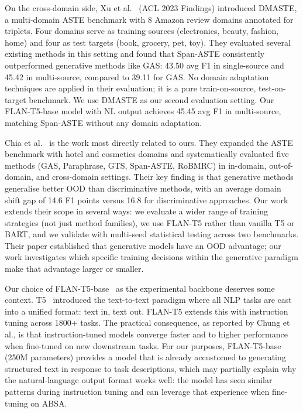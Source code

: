 \documentclass[12pt,a4paper]{report}
\begin{document}
On the cross-domain side, Xu et al.~\cite{xu2023dmaste} (ACL 2023 Findings) introduced DMASTE, a multi-domain ASTE benchmark with 8 Amazon review domains annotated for triplets. Four domains serve as training sources (electronics, beauty, fashion, home) and four as test targets (book, grocery, pet, toy). They evaluated several existing methods in this setting and found that Span-ASTE consistently outperformed generative methods like GAS: 43.50 avg F1 in single-source and 45.42 in multi-source, compared to 39.11 for GAS. No domain adaptation techniques are applied in their evaluation; it is a pure train-on-source, test-on-target benchmark. We use DMASTE as our second evaluation setting. Our FLAN-T5-base model with NL output achieves 45.45 avg F1 in multi-source, matching Span-ASTE without any domain adaptation.

Chia et al.~\cite{chia2022rethinking} is the work most directly related to ours. They expanded the ASTE benchmark with hotel and cosmetics domains and systematically evaluated five methods (GAS, Paraphrase, GTS, Span-ASTE, RoBMRC) in in-domain, out-of-domain, and cross-domain settings. Their key finding is that generative methods generalise better OOD than discriminative methods, with an average domain shift gap of 14.6 F1 points versus 16.8 for discriminative approaches. Our work extends their scope in several ways: we evaluate a wider range of training strategies (not just method families), we use FLAN-T5 rather than vanilla T5 or BART, and we validate with multi-seed statistical testing across two benchmarks. Their paper established that generative models have an OOD advantage; our work investigates which specific training decisions within the generative paradigm make that advantage larger or smaller.

Our choice of FLAN-T5-base~\cite{chung2022scaling} as the experimental backbone deserves some context. T5~\cite{raffel2020exploring} introduced the text-to-text paradigm where all NLP tasks are cast into a unified format: text in, text out. FLAN-T5 extends this with instruction tuning across 1800+ tasks. The practical consequence, as reported by Chung et al., is that instruction-tuned models converge faster and to higher performance when fine-tuned on new downstream tasks. For our purposes, FLAN-T5-base (250M parameters) provides a model that is already accustomed to generating structured text in response to task descriptions, which may partially explain why the natural-language output format works well: the model has seen similar patterns during instruction tuning and can leverage that experience when fine-tuning on ABSA.
\end{document}
